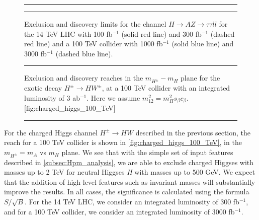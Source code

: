 {\begin{figure}
\hrule\vspace{\onelineskip}
  \caption{Exclusion and discovery limits for the channel $H\rightarrow AZ\rightarrow \tau\tau ll$ for the 14 TeV LHC with 100 fb$^{-1}$ (solid red line) and 300 fb$^{-1}$ (dashed red line) and a 100 TeV collider with 1000 fb$^{-1}$ (solid blue line) and 3000 fb$^{-1}$ (dashed blue line). }
  \vspace{\onelineskip}\hrule
\label{fig:Honglei_H_tatall}
\end{figure}

\begin{figure}
\hrule\vspace{\onelineskip}
  \begin{sidecaption}{Exclusion and discovery reaches in the $m_{H^\pm}-m_{H}$ plane for the exotic decay $H^\pm\rightarrow HW^\pm$, at a 100 TeV collider with an integrated luminosity of 3 ab$^{-1}$. Here we assume $m_{12}^2 = m_H^2s_\beta c_\beta$.}[fig:charged_higgs_100_TeV]
    
  \end{sidecaption}
\vspace{\onelineskip}\hrule
\end{figure}

For the charged Higgs channel $H^\pm\rightarrow HW$ described in the previous section, the reach for a 100 TeV collider is shown in \autoref{fig:charged_higgs_100_TeV}, in the $m_{H^\pm} = m_A$ vs $m_H$ plane. We see that with the simple set of input features described in \autoref{subsec:Hpm_analysis}, we are able to exclude charged Higgses with masses up to 2 TeV for neutral Higgses \emph{H} with masses up to 500 GeV. We expect that the addition of high-level features such as invariant masses will substantially improve the results. In all cases, the significance is calculated using the formula $S/\sqrt{B}$. For the 14 TeV LHC, we consider an integrated luminosity of 300 fb$^{-1}$, and for a 100 TeV collider, we consider an integrated luminosity of 3000 fb$^{-1}$.

}

